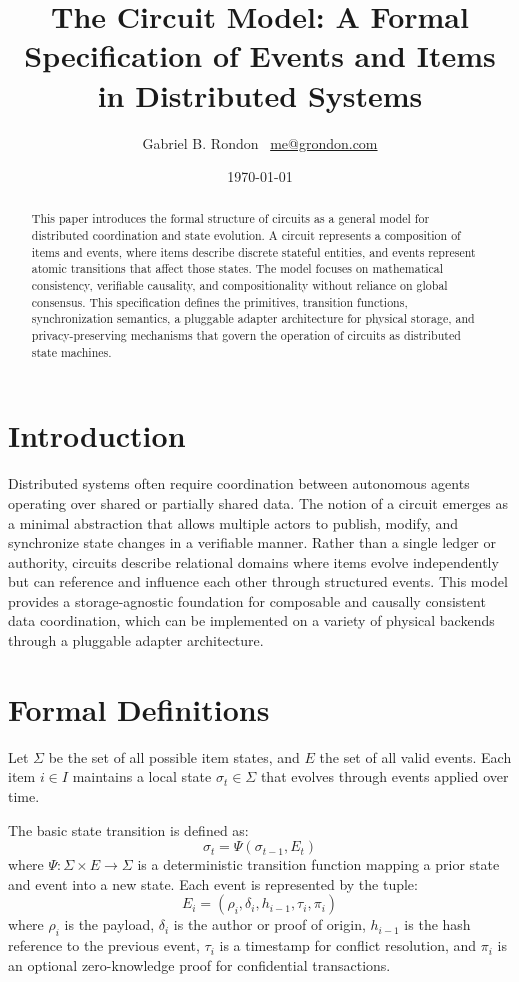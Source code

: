 \documentclass{article}
\title{\textbf{The Circuit Model: A Formal Specification of Events and Items in Distributed Systems}}
\author{Gabriel B. Rondon \ \href{mailto:me@grondon.com}{me@grondon.com}}
\date{\today}
\begin{document}
\maketitle

\begin{abstract}
This paper introduces the formal structure of circuits as a general model for distributed coordination and state evolution. A circuit represents a composition of items and events, where items describe discrete stateful entities, and events represent atomic transitions that affect those states. The model focuses on mathematical consistency, verifiable causality, and compositionality without reliance on global consensus. This specification defines the primitives, transition functions, synchronization semantics, a pluggable adapter architecture for physical storage, and privacy-preserving mechanisms that govern the operation of circuits as distributed state machines.
\end{abstract}

\section{Introduction}

Distributed systems often require coordination between autonomous agents operating over shared or partially shared data. The notion of a circuit emerges as a minimal abstraction that allows multiple actors to publish, modify, and synchronize state changes in a verifiable manner. Rather than a single ledger or authority, circuits describe relational domains where items evolve independently but can reference and influence each other through structured events. This model provides a storage-agnostic foundation for composable and causally consistent data coordination, which can be implemented on a variety of physical backends through a pluggable adapter architecture.

\section{Formal Definitions}

Let $\Sigma$ be the set of all possible item states, and $E$ the set of all valid events. Each item $i \in I$ maintains a local state $\sigma_t \in \Sigma$ that evolves through events applied over time.

The basic state transition is defined as:
\begin{equation}
\sigma_{t} = \Psi(\sigma_{t-1}, E_t)
\end{equation}
where $\Psi : \Sigma \times E \to \Sigma$ is a deterministic transition function mapping a prior state and event into a new state. Each event is represented by the tuple:
\begin{equation}
E_i = (\rho_i, \delta_i, h_{i-1}, \tau_i, \pi_i)
\end{equation}
where $\rho_i$ is the payload, $\delta_i$ is the author or proof of origin, $h_{i-1}$ is the hash reference to the previous event, $\tau_i$ is a timestamp for conflict resolution, and $\pi_i$ is an optional zero-knowledge proof for confidential transactions.
\end{document}
